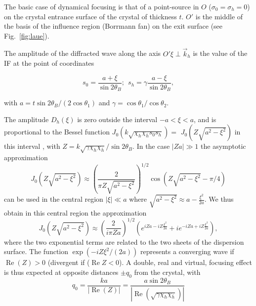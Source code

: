 \documentclass[preprint]{iucr}              %
\newcommand{\todo}[1]{{\color{red}[TODO: "#1'']}}
\newcommand{\inred}[1]{{\color{red}#1}}
\begin{document}
\inred{The basic case of dynamical focusing is that of a point-source in $O$ ($\sigma_0=\sigma_h=0$)} on the crystal entrance surface \inred{of the crystal of thickness $t$}.
\inred{$O'$ is the middle of the basis of the influence region (Borrmann fan) on the exit surface (see Fig.~\ref{fig:laue}).}
\inred{
The amplitude of the diffracted wave along the axis $O'\xi \perp \vec k_h$ is the value of the IF at the point of coordinates 

\begin{equation}
    \label{eq:s0andsh}
    s_0 = \frac{a+\xi}{\sin2\theta_B }  ; \:\: 
    s_h = \gamma\frac{a-\xi}{\sin2\theta_B},
\end{equation}
}
with $a=t \sin2\theta_B/(2\cos\theta_1)$ and $\gamma=\cos\theta_1/\cos\theta_2$. 



The amplitude $D_h(\xi)$ is zero outside the interval $-a<\xi<a$,
and is proportional to the Bessel function \inred{$J_0(k \sqrt{\chi_h \chi_{\bar h} s_0 s_h})=$} $J_0(Z\sqrt{a^2-\xi^2})$ in this interval \cite{kato1961}, with  $Z=k\sqrt{\gamma\chi_h\chi_{\bar h}}/\sin2\theta_B$. In the case $|Z a| \gg 1$ the asymptotic approximation
\begin{equation}
    J_0(Z\sqrt{a^2-\xi^2})\approx \left(\frac{2}{\pi Z \sqrt{a^2-\xi^2}}\right)^{1/2} \cos(Z\sqrt{a^2-\xi^2}-\pi/4)
\end{equation}
can be used in the central region $|\xi|\ll a$ where \inred{$\sqrt{a^2-\xi^2} \approx a - \frac{\xi^2}{2a}$}.
We thus obtain in this central region the approximation
\begin{equation}
\label{eq:approximatedDiffractedField}
    J_0(Z\sqrt{a^2-\xi^2})\approx \left(\frac{2}{i \pi Z a}\right)^{1/2} \left( e^{iZa-i Z\frac{ \xi^2}{2a}} + i 
    e^{-i Z a+i Z\frac{\xi^2}{2a}} \right),
\end{equation}
where the two exponential terms are related to the two sheets of the dispersion surface. 
\inred{The} function $\exp(- i Z \xi^2 / (2 a))$ 
represents a converging wave if $\operatorname{Re}(Z)>0$ (divergent if  ($\operatorname{Re} Z <0$). A double, real and virtual, focusing effect is thus expected at opposite distances $\pm q_0$ from the crystal, with
\begin{equation}
\label{eq:q0}
    q_0 = \frac{k a}{|\operatorname{Re}(Z)|}= \frac{a \sin2\theta_B}{|\operatorname{Re}(\sqrt{\gamma\chi_h\chi_{\bar h}})|}
\end{equation}
\end{document}
